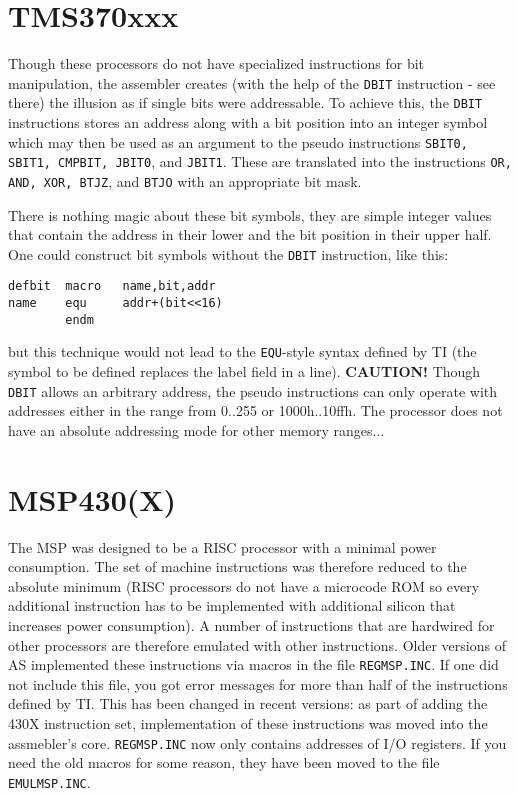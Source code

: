 \documentclass[12pt,twoside]{report}
\newcommand{\bb}[1]{{\bf #1}}
\newcommand{\tty}[1]{{\tt #1}}
\newcommand{\asname}{{AS}}
\begin{document}

\section{TMS370xxx}

Though these processors do not have specialized instructions for bit
manipulation, the assembler creates (with the help of the \tty{DBIT}
instruction - see there) the illusion as if single bits were
addressable.  To achieve this, the \tty{DBIT} instructions stores an
address along with a bit position into an integer symbol which may
then be used as an argument to the pseudo instructions \tty{SBIT0, SBIT1,
CMPBIT, JBIT0}, and \tty{JBIT1}.  These are translated into the instructions
\tty{OR, AND, XOR, BTJZ}, and \tty{BTJO} with an appropriate bit mask.

There is nothing magic about these bit symbols, they are simple
integer values that contain the address in their lower and the bit
position in their upper half.  One could construct bit symbols
without the \tty{DBIT} instruction, like this:
\begin{verbatim}
defbit  macro   name,bit,addr
name    equ     addr+(bit<<16)
        endm
\end{verbatim}
but this technique would not lead to the \tty{EQU}-style syntax defined by
TI (the symbol to be defined replaces the label field in a line).
\bb{CAUTION!} Though \tty{DBIT} allows an arbitrary address, the pseudo
instructions can only operate with addresses either in the range from
0..255 or 1000h..10ffh.  The processor does not have an absolute
addressing mode for other memory ranges...


\section{MSP430(X)}
\label{MSPSpec}

The MSP was designed to be a RISC processor with a minimal power
consumption.  The set of machine instructions was therefore reduced
to the absolute minimum (RISC processors do not have a microcode ROM
so every additional instruction has to be implemented with additional
silicon that increases power consumption).  A number of instructions
that are hardwired for other processors are therefore emulated with
other instructions.  Older versions of \asname{} implemented these
instructions via macros in the file \tty{REGMSP.INC}.  If one did
not include this file, you got error messages for more than
half of the instructions defined by TI.  This has been changed in
recent versions: as part of adding the 430X instruction set,
implementation of these instructions was moved into the assmebler's
core.  \tty{REGMSP.INC} now only contains addresses of I/O
registers.  If you need the old macros for some reason, they have
been moved to the file \tty{EMULMSP.INC}.
\end{document}
